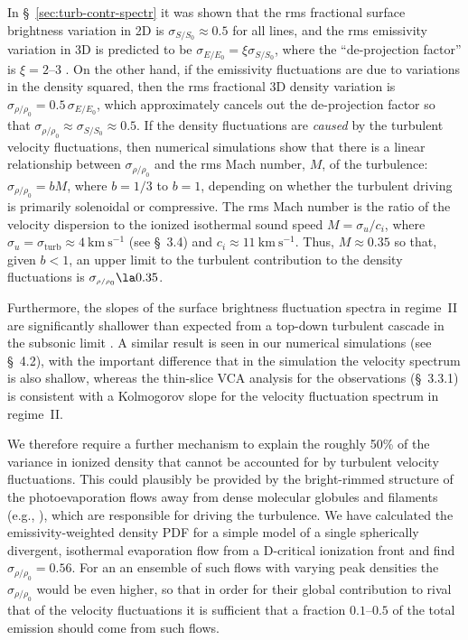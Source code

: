 \documentclass[useAMS,usenatbib]{mnras}
\newcommand\kms{\ensuremath{\mathrm{km\ s^{-1}}}}
\newcommand\turb{\ensuremath{_{\mathrm{turb}}}}
\newcommand\Efrac{\ensuremath{_{\scriptscriptstyle E/E_0}}}
\newcommand\denfrac{\ensuremath{_{\scriptscriptstyle \rho/\rho_0}}}
\newcommand\Sfrac{\ensuremath{_{\scriptscriptstyle S/S_0}}}
\begin{document}
In \S~\ref{sec:turb-contr-spectr} it was shown that the rms fractional
surface brightness variation in 2D is \(\sigma\Sfrac \approx 0.5\) for
all lines, and the rms emissivity variation in 3D is predicted to be
\(\sigma\Efrac = \xi \sigma\Sfrac\), where the ``de-projection
factor'' is \(\xi = 2\)--\(3\) \citep{Brunt:2010a}.  On the other
hand, if the emissivity fluctuations are due to variations in the
density squared, then the rms fractional 3D density variation is
\(\sigma\denfrac = 0.5\, \sigma\Efrac\), which approximately cancels
out the de-projection factor so that
\(\sigma\denfrac \approx \sigma\Sfrac \approx 0.5\).  If the density
fluctuations are \emph{caused} by the turbulent velocity fluctuations,
then numerical simulations \citep{Konstandin:2012a} show that there is
a linear relationship between \(\sigma\denfrac\) and the rms Mach
number, \(M\), of the turbulence: \(\sigma\denfrac = b M\), where
\(b = 1/3\) to \(b = 1\), depending on whether the turbulent driving
is primarily solenoidal or compressive.  The rms Mach number is the
ratio of the velocity dispersion to the ionized isothermal sound speed
\(M = \sigma_u / c_i\), where \(\sigma_u = \sigma\turb \approx 4~\kms\)
(see \S~3.4) and \(c_i \approx 11~\kms\).  Thus, \(M \approx 0.35\)
so that, given \(b < 1\), an upper limit to the turbulent contribution to the
density fluctuations is \(\sigma\denfrac \la 0.35\). 

Furthermore, the slopes of the surface brightness fluctuation spectra
in regime~II are significantly shallower than expected from a top-down
turbulent cascade in the subsonic limit \citep{Konstandin:2015a}.  A
similar result is seen in our numerical simulations (see \S~4.2), with
the important difference that in the simulation the velocity spectrum
is also shallow, whereas the thin-slice VCA analysis for the
observations (\S~3.3.1) is consistent with a Kolmogorov slope for the
velocity fluctuation spectrum in regime~II.

We therefore require a further mechanism to explain the roughly 50\%
of the variance in ionized density that cannot be accounted for by
turbulent velocity fluctuations.  This could plausibly be provided by
the bright-rimmed structure of the photoevaporation flows away from
dense molecular globules and filaments (e.g., \citep{Bertoldi:1990a,
  Henney:2009b}), which are responsible for driving the turbulence.
We have calculated the emissivity-weighted density PDF for a simple
model of a single spherically divergent, isothermal evaporation flow
from a D-critical ionization front \citep{Dyson:1968a} and find
\(\sigma\denfrac = 0.56\).  For an an ensemble of such flows with
varying peak densities the \(\sigma\denfrac\) would be even higher, so
that in order for their global contribution to rival that of the
velocity fluctuations it is sufficient that a fraction
\(0.1\)--\(0.5\) of the total emission should come from such flows.
\end{document}
